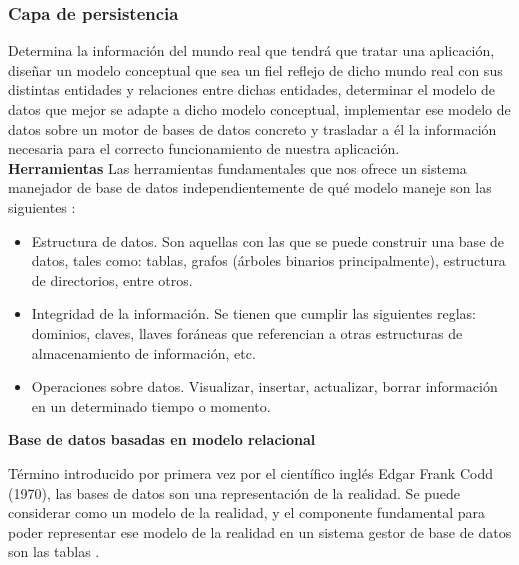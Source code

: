 %

\subsubsection{Capa de persistencia}
\label{sec:capaPersistencia}

Determina la información del mundo real que tendrá que tratar una aplicación, 
diseñar un modelo conceptual que sea un fiel reflejo de dicho mundo real con sus 
distintas entidades y relaciones entre dichas entidades, determinar el modelo de 
datos que mejor se adapte a dicho modelo conceptual, implementar ese modelo de 
datos sobre un motor de bases de datos concreto y trasladar a él la información 
necesaria para el correcto funcionamiento de nuestra aplicación.  \\


\textbf{Herramientas}
Las herramientas fundamentales que nos ofrece un sistema manejador de base de 
datos independientemente de qué modelo maneje son las siguientes 
\cite{db:masters:oficiales:doc}:

\begin{itemize}
	\item Estructura de datos. Son aquellas con las que se puede construir 
		una base de datos, tales como: tablas, grafos (árboles binarios 
		principalmente), estructura de directorios, entre otros.
	\item Integridad de la información. Se tienen que cumplir las siguientes 
		reglas: dominios, claves, llaves foráneas que referencian a 
		otras estructuras de almacenamiento de información, etc.
	\item Operaciones sobre datos. Visualizar, insertar, actualizar, borrar 
		información en un determinado tiempo o momento.
\end{itemize}

%
\textbf{Base de datos basadas en modelo relacional}
\label{sub:bdRelacionales}

Término introducido por primera vez por el científico inglés Edgar Frank Codd 
(1970), las bases de datos son una representación de la realidad. Se puede 
considerar como un modelo de la realidad, y el componente fundamental para poder 
representar ese modelo de la realidad en un sistema gestor de base de datos son 
las tablas \cite{bases_relacionales_prin_dis}. \\

